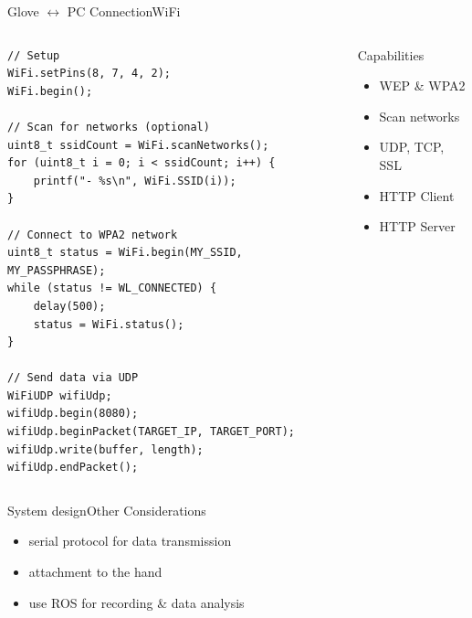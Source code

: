\begin{frame}[fragile]{Glove $\leftrightarrow$ PC Connection}{WiFi}
    \begin{columns}[T]
        \begin{column}{0.5\textwidth}
            \begin{verbatim}
// Setup
WiFi.setPins(8, 7, 4, 2);
WiFi.begin();

// Scan for networks (optional)
uint8_t ssidCount = WiFi.scanNetworks();
for (uint8_t i = 0; i < ssidCount; i++) {
    printf("- %s\n", WiFi.SSID(i));
}

// Connect to WPA2 network
uint8_t status = WiFi.begin(MY_SSID, MY_PASSPHRASE);
while (status != WL_CONNECTED) {
    delay(500);
    status = WiFi.status();
}

// Send data via UDP
WiFiUDP wifiUdp;
wifiUdp.begin(8080);
wifiUdp.beginPacket(TARGET_IP, TARGET_PORT);
wifiUdp.write(buffer, length);
wifiUdp.endPacket();
            \end{verbatim}
        \end{column}
        \begin{column}{0.5\textwidth}
            Capabilities
            \begin{itemize}
                \item WEP \& WPA2
                \item Scan networks
                \item UDP, TCP, SSL
                \item HTTP Client
                \item HTTP Server
            \end{itemize}
        \end{column}
    \end{columns}
\end{frame}


\begin{frame}{System design}{Other Considerations}
    \begin{itemize}
        \item serial protocol for data transmission
        \item attachment to the hand
        \item use ROS for recording \& data analysis
    \end{itemize}
\end{frame}
%

